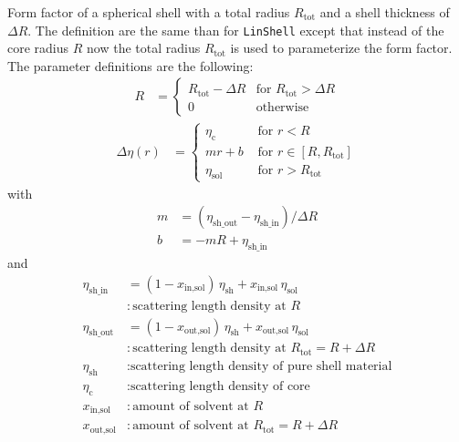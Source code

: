 Form factor of a spherical shell with a total radius
$R_\text{tot}$ and a shell thickness of $\Delta R$. The definition
are the same than for {\tt LinShell} except that instead of the
core radius $R$ now the total radius $R_\text{tot}$ is used to
parameterize the form factor. The parameter definitions are the
following:
\begin{align}
R&=
\begin{cases}
R_\text{tot}-\Delta R & \mbox{for } R_\text{tot} > \Delta R \\
0 & \mbox{otherwise}
\end{cases}
\end{align}
\begin{align}
\Delta\eta(r)      & =
\begin{cases}
\eta_\text{c} & \text{~for~} r<R \\
m r + b  & \text{~for~} r \in [R,R_\text{tot}] \\
\eta_\text{sol} & \text{~for~} r>R_\text{tot}
\end{cases}
\end{align}
with
\begin{align}
m           & = (\eta_\text{sh\_out}-\eta_\text{sh\_in}) / \Delta R \\
b           & = -m R + \eta_\text{sh\_in}
\end{align}
and
\begin{align}
\eta_\text{sh\_in}  & = (1 - x_\text{in,sol})  \, \eta_\text{sh} + x_\text{in,sol} \,\eta_\text{sol} \\
                    & : \text{scattering length density at $R$} \nonumber \\
\eta_\text{sh\_out} & = (1 - x_\text{out,sol}) \, \eta_\text{sh} + x_\text{out,sol}\,\eta_\text{sol} \\
                    & : \text{scattering length density at $R_\text{tot}=R+\Delta R$} \nonumber \\
\eta_\text{sh}      & : \text{scattering length density of pure shell material} \nonumber \\
\eta_\text{c}       & : \text{scattering length density of core} \nonumber \\
x_\text{in,sol}     & : \text{amount of solvent at $R$} \nonumber \\
x_\text{out,sol}    & : \text{amount of solvent at $R_\text{tot}=R+\Delta R$} \nonumber
\end{align}

